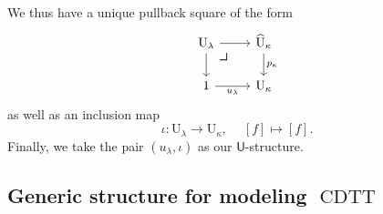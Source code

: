 \documentclass[10pt,letterpaper,cm]{nupset}
\theoremstyle{definition}
\theoremstyle{theorem}
\theoremstyle{remark}
\newcommand{\U}{\mathsf{U}}
\newcommand{\0}{\mathbf{0}}
\newcommand{\1}{\mathbf{1}}
\newcommand{\2}{\mathbf{2}}
\DeclareMathOperator{\cdtt}{\mathrm{CDTT}}
\begin{document}
\smallskip

We thus have a unique pullback square of the form
\[
\begin{tikzcd}
\mathrm{U}_{\lambda} \arrow[r] \arrow[d] 
\arrow[dr, phantom, "\scalebox{1.5}{\color{black}$\lrcorner$}" , very near start, color=black]
& \widehat{\mathrm{U}}_{\kappa} \arrow[d, "p_{\kappa}"] \\
1 \arrow[r, "u_{\lambda}"']                              & \mathrm{U}_{\kappa}                    
\end{tikzcd}
\] as well as an inclusion map 
\[
\iota : \mathrm{U}_{\lambda} \to \mathrm{U}_{\kappa}, \ \quad \left[f\right] \mapsto \left[f\right]
.\] Finally, we take the pair $\left(u_{\lambda}, \iota\right)$ as  our $\U$-structure.

\subsection*{Generic structure for modeling $\cdtt$}
\end{document}
